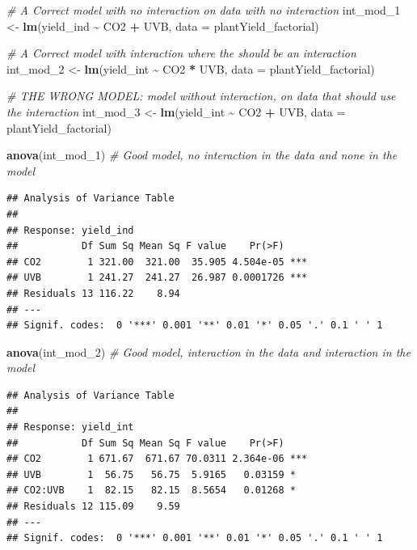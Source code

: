 \documentclass[
]{book}
\newenvironment{Shaded}{\begin{snugshade}}{\end{snugshade}}
\newcommand{\AttributeTok}[1]{\textcolor[rgb]{0.13,0.29,0.53}{#1}}
\newcommand{\CommentTok}[1]{\textcolor[rgb]{0.56,0.35,0.01}{\textit{#1}}}
\newcommand{\FunctionTok}[1]{\textcolor[rgb]{0.13,0.29,0.53}{\textbf{#1}}}
\newcommand{\NormalTok}[1]{#1}
\newcommand{\OtherTok}[1]{\textcolor[rgb]{0.56,0.35,0.01}{#1}}
\newcommand{\SpecialCharTok}[1]{\textcolor[rgb]{0.81,0.36,0.00}{\textbf{#1}}}
\begin{document}
\begin{Shaded}
\begin{Highlighting}[]
\CommentTok{\# A Correct model with no interaction on data with no interaction}
\NormalTok{int\_mod\_1 }\OtherTok{\textless{}{-}} \FunctionTok{lm}\NormalTok{(yield\_ind }\SpecialCharTok{\textasciitilde{}}\NormalTok{ CO2 }\SpecialCharTok{+}\NormalTok{ UVB, }\AttributeTok{data =}\NormalTok{ plantYield\_factorial)}

\CommentTok{\# A Correct model with interaction where the should be an interaction}
\NormalTok{int\_mod\_2 }\OtherTok{\textless{}{-}} \FunctionTok{lm}\NormalTok{(yield\_int }\SpecialCharTok{\textasciitilde{}}\NormalTok{ CO2 }\SpecialCharTok{*}\NormalTok{ UVB, }\AttributeTok{data =}\NormalTok{ plantYield\_factorial)}

\CommentTok{\# THE WRONG MODEL: model without interaction, on data that should use the interaction}
\NormalTok{int\_mod\_3 }\OtherTok{\textless{}{-}} \FunctionTok{lm}\NormalTok{(yield\_int }\SpecialCharTok{\textasciitilde{}}\NormalTok{ CO2 }\SpecialCharTok{+}\NormalTok{ UVB, }\AttributeTok{data =}\NormalTok{ plantYield\_factorial)}

\FunctionTok{anova}\NormalTok{(int\_mod\_1) }\CommentTok{\# Good model, no interaction in the data and none in the model}
\end{Highlighting}
\end{Shaded}

\begin{verbatim}
## Analysis of Variance Table
## 
## Response: yield_ind
##           Df Sum Sq Mean Sq F value    Pr(>F)    
## CO2        1 321.00  321.00  35.905 4.504e-05 ***
## UVB        1 241.27  241.27  26.987 0.0001726 ***
## Residuals 13 116.22    8.94                      
## ---
## Signif. codes:  0 '***' 0.001 '**' 0.01 '*' 0.05 '.' 0.1 ' ' 1
\end{verbatim}

\begin{Shaded}
\begin{Highlighting}[]
\FunctionTok{anova}\NormalTok{(int\_mod\_2) }\CommentTok{\# Good model, interaction in the data and interaction in the model}
\end{Highlighting}
\end{Shaded}

\begin{verbatim}
## Analysis of Variance Table
## 
## Response: yield_int
##           Df Sum Sq Mean Sq F value    Pr(>F)    
## CO2        1 671.67  671.67 70.0311 2.364e-06 ***
## UVB        1  56.75   56.75  5.9165   0.03159 *  
## CO2:UVB    1  82.15   82.15  8.5654   0.01268 *  
## Residuals 12 115.09    9.59                      
## ---
## Signif. codes:  0 '***' 0.001 '**' 0.01 '*' 0.05 '.' 0.1 ' ' 1
\end{verbatim}
\end{document}
